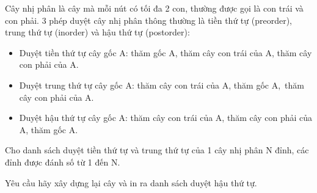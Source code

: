 Cây nhị phân là cây mà mỗi nút có tối đa 2 con, thường được gọi là con trái và con phải. 3 phép duyệt cây nhị phân thông thường là tiền thứ tự (preorder), trung thứ tự (inorder) và hậu thứ tự (postorder):
\begin{itemize}
	\item Duyệt tiền thứ tự cây gốc A: thăm gốc A, thăm cây con trái của A, thăm cây con phải của A.
	\item Duyệt trung thứ tự cây gốc A: thăm cây con trái của A, thăm gốc A, thăm cây con phải của A.
	\item Duyệt hậu thứ tự cây gốc A: thăm cây con trái của A, thăm cây con phải của A, thăm gốc A.
\end{itemize}

Cho danh sách duyệt tiền thứ tự và trung thứ tự của 1 cây nhị phân N đỉnh, các đỉnh được đánh số từ 1 đến N.

Yêu cầu hãy xây dựng lại cây và in ra danh sách duyệt hậu thứ tự.
